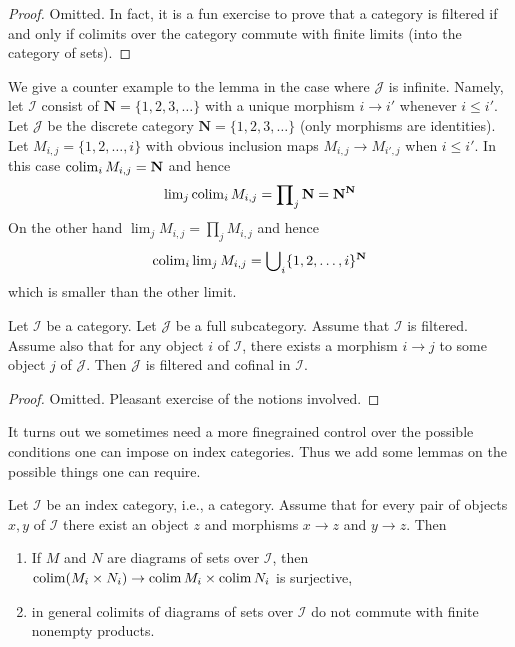 \begin{proof}
Omitted. In fact, it is a fun exercise to prove that a category is
filtered if and only if colimits over the category commute with finite
limits (into the category of sets).
\end{proof}

\noindent
We give a counter example to the lemma in
the case where $\mathcal{J}$ is infinite. Namely, let
$\mathcal{I}$ consist of $\mathbf{N} = \{1, 2, 3, \ldots\}$
with a unique morphism $i \to i'$ whenever $i \leq i'$.
Let $\mathcal{J}$ be the discrete category
$\mathbf{N} = \{1, 2, 3, \ldots\}$ (only morphisms are identities).
Let $M_{i, j} = \{1, 2, \ldots, i\}$ with obvious inclusion maps
$M_{i, j} \to M_{i', j}$ when $i \leq i'$. In this case
$\mathop{\mathrm{colim}}\nolimits_i M_{i, j} = \mathbf{N}$ and hence
$$
\mathop{\mathrm{lim}}\nolimits_j \mathop{\mathrm{colim}}\nolimits_i M_{i, j}
=
\prod\nolimits_j \mathbf{N}
=
\mathbf{N}^\mathbf{N}
$$
On the other hand $\lim_j M_{i, j} = \prod\nolimits_j M_{i, j}$ and
hence
$$
\mathop{\mathrm{colim}}\nolimits_i \mathop{\mathrm{lim}}\nolimits_j M_{i, j}
=
\bigcup\nolimits_i \{1, 2, \ldots, i\}^{\mathbf{N}}
$$
which is smaller than the other limit.

\begin{lemma}
\label{lemma-cofinal-in-filtered}
\begin{reference}
\cite[Proposition 3.2.4]{KS}
\end{reference}
Let $\mathcal{I}$ be a category. Let $\mathcal{J}$ be a full subcategory.
Assume that $\mathcal{I}$ is filtered. Assume also that for any object
$i$ of $\mathcal{I}$, there exists a morphism $i \to j$
to some object $j$ of $\mathcal{J}$. Then $\mathcal{J}$
is filtered and cofinal in $\mathcal{I}$.
\end{lemma}

\begin{proof}
Omitted. Pleasant exercise of the notions involved.
\end{proof}

\noindent
It turns out we sometimes need a more finegrained control over the
possible conditions one can impose on index categories. Thus we add
some lemmas on the possible things one can require.

\begin{lemma}
\label{lemma-preserve-products}
Let $\mathcal{I}$ be an index category, i.e., a category. Assume
that for every pair of objects $x, y$ of $\mathcal{I}$
there exist an object $z$ and morphisms $x \to z$ and $y \to z$.
Then
\begin{enumerate}
\item If $M$ and $N$ are diagrams of sets over $\mathcal{I}$,
then $\mathop{\mathrm{colim}}\nolimits (M_i \times N_i) \to \mathop{\mathrm{colim}}\nolimits M_i \times \mathop{\mathrm{colim}}\nolimits N_i$
is surjective,
\item in general colimits of diagrams of sets over $\mathcal{I}$
do not commute with finite nonempty products.
\end{enumerate}
\end{lemma}

